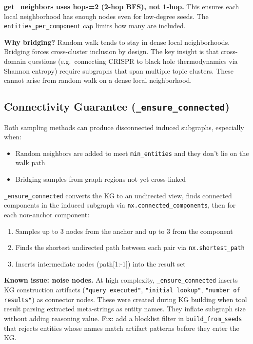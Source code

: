 \documentclass[11pt,a4paper]{article}
\begin{document}
\textbf{get\_neighbors uses hops=2 (2-hop BFS), not 1-hop.} This ensures each local neighborhood has enough nodes even for low-degree seeds. The \texttt{entities\_per\_component} cap limits how many are included.

\textbf{Why bridging?} Random walk tends to stay in dense local neighborhoods. Bridging forces cross-cluster inclusion by design. The key insight is that cross-domain questions (e.g.\ connecting CRISPR to black hole thermodynamics via Shannon entropy) require subgraphs that span multiple topic clusters. These cannot arise from random walk on a dense local neighborhood.

\subsection{Connectivity Guarantee (\texttt{\_ensure\_connected})}

Both sampling methods can produce disconnected induced subgraphs, especially when:
\begin{itemize}[leftmargin=*,noitemsep]
  \item Random neighbors are added to meet \texttt{min\_entities} and they don't lie on the walk path
  \item Bridging samples from graph regions not yet cross-linked
\end{itemize}

\texttt{\_ensure\_connected} converts the KG to an undirected view, finds connected components in the induced subgraph via \texttt{nx.connected\_components}, then for each non-anchor component:
\begin{enumerate}[leftmargin=*,noitemsep]
  \item Samples up to 3 nodes from the anchor and up to 3 from the component
  \item Finds the shortest undirected path between each pair via \texttt{nx.shortest\_path}
  \item Inserts intermediate nodes (path[1:-1]) into the result set
\end{enumerate}

\textbf{Known issue: noise nodes.} At high complexity, \texttt{\_ensure\_connected} inserts KG construction artifacts (\texttt{"query executed"}, \texttt{"initial lookup"}, \texttt{"number of results"}) as connector nodes. These were created during KG building when tool result parsing extracted meta-strings as entity names. They inflate subgraph size without adding reasoning value. Fix: add a blocklist filter in \texttt{build\_from\_seeds} that rejects entities whose names match artifact patterns before they enter the KG.
\end{document}
